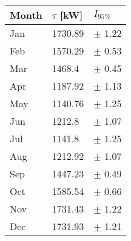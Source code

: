 \begin{tabular}{lll}
\toprule
Month & $\tau$ [kW] &  $I_{95\%}$ \\
\midrule
  Jan &     1730.89 &  $\pm$ 1.22 \\
  Feb &     1570.29 &  $\pm$ 0.53 \\
  Mar &      1468.4 &  $\pm$ 0.45 \\
  Apr &     1187.92 &  $\pm$ 1.13 \\
  May &     1140.76 &  $\pm$ 1.25 \\
  Jun &      1212.8 &  $\pm$ 1.07 \\
  Jul &      1141.8 &  $\pm$ 1.25 \\
  Aug &     1212.92 &  $\pm$ 1.07 \\
  Sep &     1447.23 &  $\pm$ 0.49 \\
  Oct &     1585.54 &  $\pm$ 0.66 \\
  Nov &     1731.43 &  $\pm$ 1.22 \\
  Dec &     1731.93 &  $\pm$ 1.21 \\
\bottomrule
\end{tabular}
